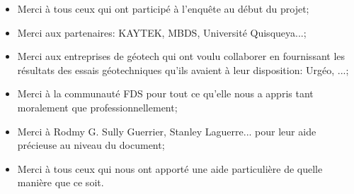 \begin{itemize}
    \item Merci à tous ceux qui ont participé à l'enquête au début du projet;\par
    \item Merci aux partenaires: KAYTEK, MBDS, Université Quisqueya...;\par
    \item Merci aux entreprises de géotech qui ont voulu collaborer en fournissant les résultats
    des essais géotechniques qu'ils avaient à leur disposition: Urgéo, ...;\par
    \item Merci à la communauté FDS pour tout ce qu'elle nous a appris tant 
    moralement que professionnellement;\par
    \item Merci à Rodmy G. Sully Guerrier, Stanley Laguerre... pour leur aide précieuse 
    au niveau du document; \par
    \item Merci à tous ceux qui nous ont apporté une aide particulière de quelle manière 
    que ce soit. \par 
\end{itemize}
